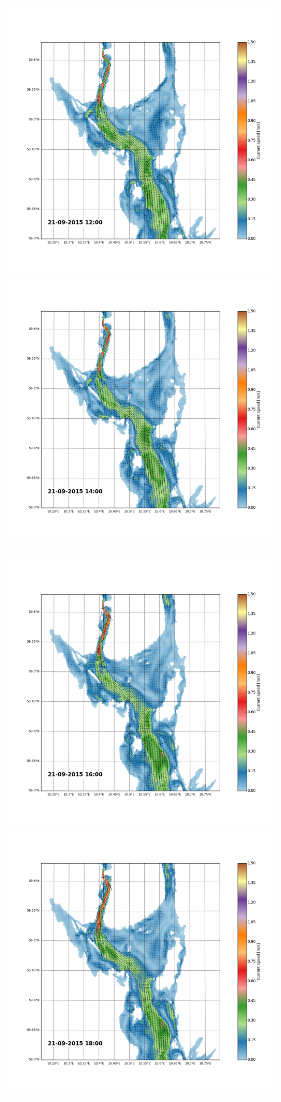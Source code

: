 \documentclass[12pt,a4paper,english]{article}
\begin{document}
\begin{figure}[h]
\centerline{
\includegraphics*[trim=2.0cm 3cm 6.0cm 3.5cm,clip=true,height=7cm]{Python/stromfelt_70}
\includegraphics*[trim=3.7cm 3cm 1.3cm 3.5cm,clip=true,height=7cm]{Python/stromfelt_72}
}
\centerline{
\includegraphics*[trim=2.0cm 3cm 6.0cm 3.5cm,clip=true,height=7cm]{Python/stromfelt_74}
\includegraphics*[trim=3.7cm 3cm 1.3cm 3.5cm,clip=true,height=7cm]{Python/stromfelt_76}
}
\end{figure}
\end{document}
